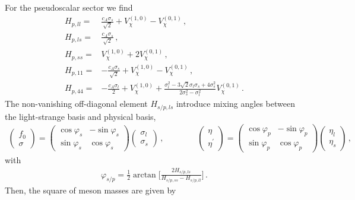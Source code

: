 \documentclass[reprint,twocolumn,superscriptaddress,preprintnumbers,amsmath,amssymb,aps,prd,floatfix]{revtex4-2}
\begin{document}
%
For the pseudoscalar sector we find 
%
\begin{align}\nonumber 
	H_{p,ll}=&\frac{c_A \sigma_s}{\sqrt{2}}+V_\chi^{(1,0)}-V_\chi^{(0,1)}\,,\\[1ex]\nonumber 
	H_{p,ls}=&\frac{c_A \sigma_s}{\sqrt{2}}\,,\\[1ex]\nonumber 
	H_{p,ss}=&V_\chi^{(1,0)}+2 V_\chi^{(0,1)}\,,\\[1ex]\nonumber 
	H_{p,11}=&-\frac{c_A \sigma_s}{\sqrt{2}}+V_\chi^{(1,0)}-V_\chi^{(0,1)}\,,\\[1ex]
	H_{p,44}=&- \frac{c_A \sigma_l}{2} + V_\chi^{(1,0)} + \frac{\sigma_l^2- 3 \sqrt{2} \sigma_l \sigma_s+4 \sigma_s^2}{2 \sigma_s^2-\sigma_l^2} V_\chi^{(0,1)}\,. 
	\label{eq:Hp}
\end{align}
%
The non-vanishing off-diagonal element $H_{s/p, ls}$ introduce mixing angles between the light-strange basis and physical basis, 
%
\begin{align}
\begin{pmatrix}f_0 \\[1ex] \sigma \end{pmatrix} 
= \begin{pmatrix} \cos\varphi_s & - \sin\varphi_s \\[1ex] \sin\varphi_s & \cos\varphi_s \end{pmatrix} \begin{pmatrix}\sigma_l \\[1ex] \sigma_s \end{pmatrix}\,,\qquad \qquad 
\begin{pmatrix}\eta \\[1ex] 
\eta^\prime \end{pmatrix} 
= \begin{pmatrix} \cos\varphi_p & - \sin\varphi_p \\[1ex]\sin\varphi_p & \cos\varphi_p \end{pmatrix} \begin{pmatrix}\eta_l \\[1ex] \eta_s \end{pmatrix}\,,
\label{eq:plstrafo}
\end{align}
%
with
%
\begin{align}
\varphi_{s/p}=\frac{1}{2} \arctan\Biggl[\frac{2H_{s/p,ls}}{H_{s/p,ss}-H_{s/p,ll}}\Biggr]\,.
\label{eq:mix_phi}
\end{align}
%
Then, the square of meson masses are given by
%
\end{document}
